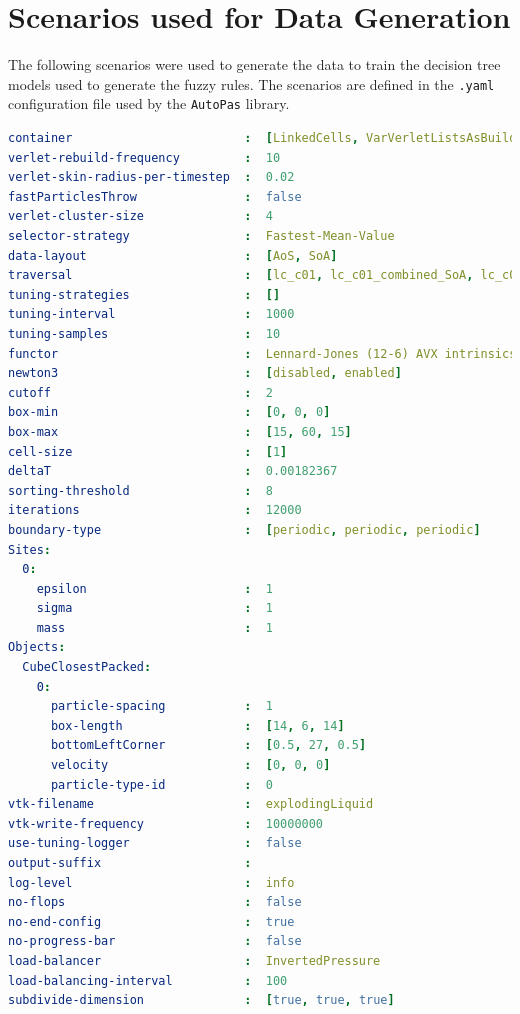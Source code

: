 \section{Scenarios used for Data Generation}
\label{des:scenarios}

The following scenarios were used to generate the data to train the decision tree models used to generate the fuzzy rules. The scenarios are defined in the \texttt{.yaml} configuration file used by the \texttt{AutoPas} library.

\begin{lstlisting}[language=yaml,basicstyle=\tiny,breaklines=true,  caption={explodingLiquid.yaml}, label={lst:explodingLiquid}]
container                        :  [LinkedCells, VarVerletListsAsBuild, VerletClusterLists, VerletLists, VerletListsCells, PairwiseVerletLists]
verlet-rebuild-frequency         :  10
verlet-skin-radius-per-timestep  :  0.02
fastParticlesThrow               :  false
verlet-cluster-size              :  4
selector-strategy                :  Fastest-Mean-Value
data-layout                      :  [AoS, SoA]
traversal                        :  [lc_c01, lc_c01_combined_SoA, lc_c04, lc_c04_HCP, lc_c04_combined_SoA, lc_c08, lc_c18, lc_sliced, lc_sliced_balanced, lc_sliced_c02, vcl_c01_balanced, vcl_c06, vcl_sliced, vcl_sliced_balanced, vcl_sliced_c02, vl_list_iteration, vlc_c01, vlc_c18, vlc_sliced, vlc_sliced_balanced, vlc_sliced_c02, vlp_c01, vlp_c18, vlp_sliced, vlp_sliced_balanced, vlp_sliced_c02, vvl_as_built]
tuning-strategies                :  []
tuning-interval                  :  1000
tuning-samples                   :  10
functor                          :  Lennard-Jones (12-6) AVX intrinsics
newton3                          :  [disabled, enabled]
cutoff                           :  2
box-min                          :  [0, 0, 0]
box-max                          :  [15, 60, 15]
cell-size                        :  [1]
deltaT                           :  0.00182367
sorting-threshold                :  8
iterations                       :  12000
boundary-type                    :  [periodic, periodic, periodic]
Sites:                           
  0:
    epsilon                      :  1
    sigma                        :  1
    mass                         :  1
Objects:                         
  CubeClosestPacked:
    0:  
      particle-spacing           :  1
      box-length                 :  [14, 6, 14]
      bottomLeftCorner           :  [0.5, 27, 0.5]
      velocity                   :  [0, 0, 0]
      particle-type-id           :  0
vtk-filename                     :  explodingLiquid
vtk-write-frequency              :  10000000
use-tuning-logger                :  false
output-suffix                    :  
log-level                        :  info
no-flops                         :  false
no-end-config                    :  true
no-progress-bar                  :  false
load-balancer                    :  InvertedPressure
load-balancing-interval          :  100
subdivide-dimension              :  [true, true, true]
\end{lstlisting}

